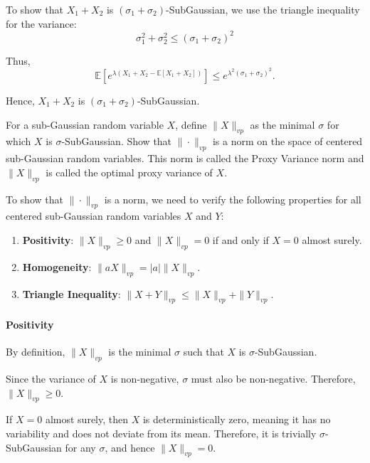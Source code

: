 \documentclass[a4 paper]{article}
\numberwithin{equation}{section}
\theoremstyle{boldStyle}
\theoremstyle{boldBlueStyle}
\theoremstyle{boldPurpleStyle}
\theoremstyle{boldRedStyle}
\begin{document}
\begin{enumerate}
To show that \(X_1 + X_2\) is \((\sigma_1 + \sigma_2)\)-SubGaussian, we use the triangle inequality for the variance:
\[
\sigma_1^2 + \sigma_2^2 \leq (\sigma_1 + \sigma_2)^2
\]

Thus,
\[
\mathbb{E}\left[e^{\lambda (X_1 + X_2 - \mathbb{E}[X_1 + X_2])}\right] \leq e^{\lambda^2 (\sigma_1 + \sigma_2)^2}.
\]

Hence, \(X_1 + X_2\) is \((\sigma_1 + \sigma_2)\)-SubGaussian.











\newpage
\textcolor{blueColor}{
\item For a sub-Gaussian random variable \(X\), define \(\|X\|_{vp}\) as the minimal \(\sigma\) for which \(X\) is \(\sigma\)-SubGaussian. 
Show that \(\|\cdot\|_{vp}\) is a norm on the space of centered sub-Gaussian random variables. This norm is called the Proxy Variance norm and \(\|X\|_{vp}\) 
is called the optimal proxy variance of \(X\).
}

\bigbreak

To show that \(\|\cdot\|_{vp}\) is a norm, we need to verify the following properties for all centered sub-Gaussian random variables \(X\) and \(Y\):
\begin{enumerate}
  \item \textbf{Positivity}: \(\|X\|_{vp} \geq 0\) and \(\|X\|_{vp} = 0\) if and only if \(X = 0\) almost surely.
  \item \textbf{Homogeneity}: \(\|aX\|_{vp} = |a| \|X\|_{vp}\).
  \item \textbf{Triangle Inequality}: \(\|X + Y\|_{vp} \leq \|X\|_{vp} + \|Y\|_{vp}\).
\end{enumerate}

\paragraph{Positivity} 

By definition, \(\|X\|_{vp}\) is the minimal \(\sigma\) such that \(X\) is \(\sigma\)-SubGaussian. 

Since the variance of \(X\) is non-negative, \(\sigma\) must also be non-negative. Therefore, \(\|X\|_{vp} \geq 0\). 


If \(X = 0\) almost surely, then \(X\) is deterministically zero, meaning it has no variability and does not deviate from its mean. 
Therefore, it is trivially \(\sigma\)-SubGaussian for any \(\sigma\), and hence \(\|X\|_{vp} = 0\). 


\end{enumerate}
\end{document}
